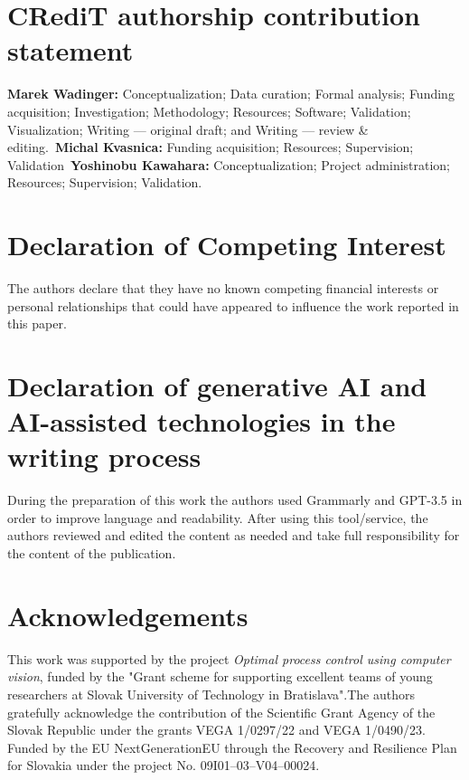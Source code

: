 \documentclass[journal]{IEEEtran}
\begin{document}
\section*{CRediT authorship contribution statement}
\textbf{Marek Wadinger:} Conceptualization; Data curation; Formal analysis; Funding acquisition; Investigation; Methodology; Resources; Software; Validation; Visualization; Writing --- original draft; and Writing --- review \& editing.~\textbf{Michal Kvasnica:} Funding acquisition; Resources; Supervision; Validation~\textbf{Yoshinobu Kawahara:} Conceptualization; Project administration; Resources; Supervision; Validation.

\section*{Declaration of Competing Interest}
The authors declare that they have no known competing financial interests or personal relationships that could have appeared to influence the work reported in this paper.

\section*{Declaration of generative AI and AI-assisted technologies in the writing process}
During the preparation of this work the authors used Grammarly and GPT-3.5 in order to improve language and readability. After using this tool/service, the authors reviewed and edited the content as needed and take full responsibility for the content of the publication.

\section*{Acknowledgements}
This work was supported by the project \emph{Optimal process control using computer vision}, funded by the "Grant scheme for supporting excellent teams of young researchers at Slovak University of Technology in Bratislava".The authors gratefully acknowledge the contribution of the Scientific Grant Agency of the Slovak Republic under the grants VEGA 1/0297/22 and VEGA 1/0490/23. Funded by the EU NextGenerationEU through the Recovery and Resilience Plan for Slovakia under the project No. 09I01--03--V04--00024.



\end{document}
